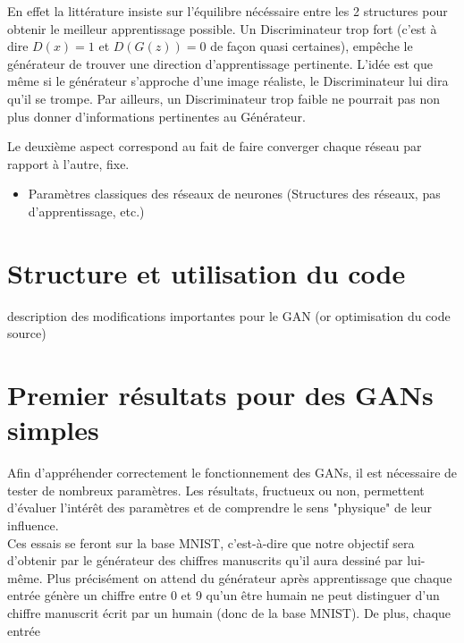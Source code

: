 	En effet la littérature insiste sur l'équilibre nécéssaire entre les 2 structures pour obtenir le meilleur apprentissage possible. Un Discriminateur trop fort (c'est à dire $D(x) = 1 $ et $ D(G(z)) = 0$ de façon quasi certaines), empêche le générateur de trouver une direction d'apprentissage pertinente. L'idée est que même si le générateur s'approche d'une image réaliste, le Discriminateur lui dira qu'il se trompe. Par ailleurs, un Discriminateur trop faible ne pourrait pas non plus donner d'informations pertinentes au Générateur.

	Le deuxième aspect correspond au fait de faire converger chaque réseau par rapport à l'autre, fixe.
	\begin{itemize}
	 	\item Paramètres classiques des réseaux de neurones (Structures des réseaux, pas d'apprentissage, etc.)
	\end{itemize}


\section{Structure et utilisation du code}
	{description des modifications importantes pour le GAN (or optimisation du code source)}


\section{Premier résultats pour des GANs simples}
	Afin d'appréhender correctement le fonctionnement des GANs, il est nécessaire de tester de nombreux paramètres. Les résultats, fructueux ou non, permettent d'évaluer l'intérêt des paramètres et de comprendre le sens "physique" de leur influence.\\
	Ces essais se feront sur la base MNIST, c'est-à-dire que notre objectif sera d'obtenir par le générateur des chiffres manuscrits qu'il aura dessiné par lui-même. Plus précisément on attend du générateur après apprentissage que chaque entrée génère un chiffre entre 0 et 9 qu'un être humain ne peut distinguer d'un chiffre manuscrit écrit par un humain (donc de la base MNIST). De plus, chaque entrée 

